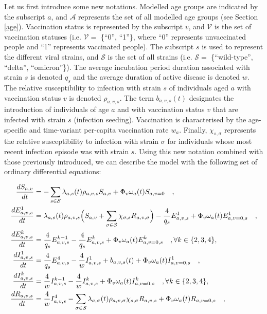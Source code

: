 Let us first introduce some new notations. Modelled age groups are indicated by the subscript $a$, and $\mathcal{A}$ represents
the set of all modelled age groups (see Section \ref{age}). Vaccination status is represented by the subscript $v$, and $\mathcal{V}$ is the set of 
vaccination statuses (i.e. $\mathcal{V}=$ \{``0'', ``1''\}, where ``0'' represents unvaccinated people and ``1'' represents vaccinated people). The subscript $s$ is used to represent the different viral strains, and $\mathcal{S}$ is the set 
of all strains (i.e. $\mathcal{S}=$ \{``wild-type'', ``delta'', ``omicron''\}). The average incubation period duration associated with strain $s$ is denoted $q_s$ and
the average duration of active disease is denoted $w$. The relative susceptibility to infection with strain $s$ of individuals aged $a$ with 
vaccination status $v$ is denoted $\rho_{a,v,s}$. The term $b_{a,v,s}(t)$ designates the introduction of individuals of age $a$ and 
with vaccination status $v$ that are infected with strain $s$ (infection seeding). Vaccination is characterised by the age-specific
and time-variant per-capita vaccination rate $w_a$. Finally, $\chi_{s,\sigma}$ represents the relative susceptibility to infection
with strain $\sigma$ for individuals whose most recent infection episode was with strain $s$. Using this new notation combined 
with those previously introduced, we can describe the model with the following set of ordinary differential equations:

\begin{equation}
    \label{ode}
    \begin{split}
\frac{dS_{a,v}}{dt} & = -\sum_{s \in \mathcal{S}} \lambda_{a,s}(t)\rho_{a,v,s} S_{a,v} + \Phi_v\omega_a(t)S_{a,v=0}  \quad , \\
\frac{dE_{a,v,s}^{1}}{dt} & =\lambda_{a,s}(t)\rho_{a,v,s} \Bigl(S_{a,v}  +  \sum_{\sigma \in \mathcal{S}} \chi_{\sigma, s} R_{a,v,\sigma} \Bigr) - \frac{4}{q_{s}}E_{a,v,s}^{1} + \Phi_v\omega_a(t)E_{a,v=0,s}^1 \quad , \\
\frac{dE_{a,v,s}^{k}}{dt} & = \frac{4}{q_{s}}E_{a,v,s}^{k-1} - \frac{4}{q_{s}}E_{a,v,s}^{k} + \Phi_v\omega_a(t)E_{a,v=0,s}^k \quad,  \forall k \in \{2,3,4\} , \\
\frac{dI_{a,v,s}^{1}}{dt} & = \frac{4}{q_{s}}E_{a,v,s}^{4} - \frac{4}{w}I_{a,v,s}^{1} + b_{a,v,s}(t) + \Phi_v\omega_a(t)I_{a,v=0,s}^1 \quad , \\
\frac{dI_{a,v,s}^{k}}{dt} & = \frac{4}{w}I_{a,v,s}^{k-1} - \frac{4}{w}I_{a,v,s}^{k} + \Phi_v\omega_a(t)I_{a,v=0,s}^k \quad, \forall k \in \{2,3,4\} , \\
\frac{dR_{a,v,s}}{dt} & = \frac{4}{w}I_{a,v,s}^{4} - \sum _{\sigma \in \mathcal{S}} \lambda_{a,\sigma}(t)\rho_{a,v,\sigma} \chi_{s, \sigma} R_{a,v, s} + \Phi_v\omega_a(t)R_{a,v=0,s} \quad, 
    \end{split}
\end{equation}

